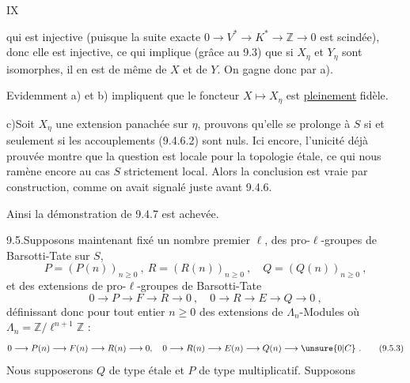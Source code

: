 \hfill IX

qui est injective (puisque la suite exacte $0\longrightarrow V^*\longrightarrow K^*\longrightarrow\mathbb Z\longrightarrow0$ est scindée), donc elle est injective, ce qui implique (grâce au  9.3) que si $X_\eta$ et $Y_\eta$ sont isomorphes, il en est de même de $X$ et de $Y$. On gagne donc par a).

Evidemment a) et b) impliquent que le foncteur $X\longmapsto X_\eta$ est \uline{pleinement} fidèle.

c)\quad Soit $X_\eta$ une extension panachée sur $\eta$, prouvons qu'elle se prolonge à $S$ si et seulement si les accouplements (9.4.6.2) sont nuls. Ici encore, l'unicité déjà prouvée montre que la question est locale pour la topologie étale, ce qui nous\unsure{,} ramène encore au cas $S$ strictement local. Alors la conclusion est vraie par construction, comme on avait signalé juste avant 9.4.6.

Ainsi la démonstration de 9.4.7 est achevée.

9.5.\quad Supposons maintenant fixé un nombre premier $\ell$, des pro-$\ell$-groupes de Barsotti-Tate sur $S$,
\[
 P=(P(n))_{n\geq0}\ ,\ R=(R(n))_{n\geq0}\ ,\quad Q=(Q(n))_{n\geq0}\ ,\tag*{(9.5.1)}
\]
et des extensions de pro-$\ell$-groupes de Barsotti-Tate
\[
 0\longrightarrow P\longrightarrow F\longrightarrow R\longrightarrow0\ ,\quad
 0\longrightarrow R\longrightarrow E\longrightarrow Q\longrightarrow0\ ,\tag*{(9.5.2)}
\]
définissant donc pour tout entier $n\geq0$ des extensions de $\Lambda_n$-Modules où $\Lambda_n=\mathbb Z/\ell^{n+1}\mathbb Z$ :
\[
 0\longrightarrow P(n)\longrightarrow F(n)\longrightarrow R(n)\longrightarrow0,\quad
 0\longrightarrow R(n)\longrightarrow E(n)\longrightarrow Q(n)\longrightarrow\unsure{0|C}\ .\tag*{(9.5.3)}
\]
Nous supposerons $Q$ de type étale et $P$ de type multiplicatif. Supposons
